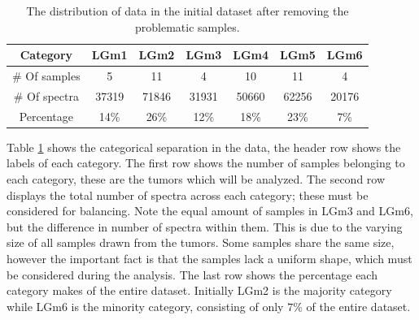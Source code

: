 \begin{table}[htb]
\centering
 \begin{tabular}{||c c c c c c c||} 
 \hline
 Category & LGm1 & LGm2 & LGm3 & LGm4 & LGm5 & LGm6 \\ [0.5ex] 
 \hline\hline
 \# Of samples & 5& 11 & 4 & 10 & 11 & 4 \\ 
 \hline
 \# Of spectra & 37319 & 71846 & 31931 & 50660 & 62256 & 20176 \\
 \hline
 Percentage & 14\%& 26\% & 12\% & 18\% & 23\% & 7\% \\
 \hline

\end{tabular}
\caption{The distribution of data in the initial dataset after removing the problematic samples.}
\label{table:1}
\end{table}

Table \ref{table:1} shows the categorical separation in the data, the header row shows the labels of each category. The first row shows the number of samples belonging to each category, these are the tumors which will be analyzed. The second row displays the total number of spectra across each category; these must be considered for balancing. Note the equal amount of samples in LGm3 and LGm6, but the difference in number of spectra within them. This is due to the varying size of all samples drawn from the tumors. Some samples share the same size, however the important fact is that the samples lack a uniform shape, which must be considered during the analysis. The last row shows the percentage each category makes of the entire dataset. Initially LGm2 is the majority category while LGm6 is the minority category, consisting of only $7$\% of the entire dataset.

